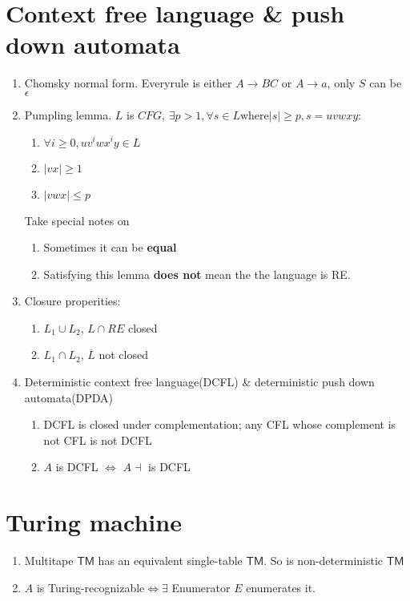 \documentclass{article}
\newcommand{\TM}{\mathsf{TM}}
\newcommand{\TR}{Turing-recognizable}
\begin{document}
\section{Context free language \& push down automata}\begin{enumerate}
	\item Chomsky normal form. Everyrule is either $A \rightarrow BC$ or $A \rightarrow a$, only $S$ can be $\epsilon$
	\item Pumpling lemma. $L$ is $CFG$, $\exists p > 1, \forall s \in L \text{where} |s| \ge p, s = uvwxy$:
	\begin{enumerate}
		\item $\forall i \ge 0, uv^iwx^iy \in L$
		\item $|vx| \ge 1$
		\item $|vwx| \le p$
	\end{enumerate}
	Take special notes on
	\begin{enumerate}
		\item Sometimes it can be \textbf{equal}
		\item Satisfying this lemma \textbf{does not} mean the the language is RE.
	\end{enumerate}
	\item Closure properities:
	\begin{enumerate}
		\item $L_1 \cup L_2$, $L \cap RE$ closed
		\item $L_1 \cap L_2$, $\overline{L}$ not closed
	\end{enumerate}
	\item Deterministic context free language(DCFL) \& deterministic push down automata(DPDA)
	\begin{enumerate}
		\item DCFL is closed under complementation; any CFL whose complement is not CFL is not DCFL
		\item $A$ is DCFL $\Longleftrightarrow$ $A\dashv$ is DCFL
	\end{enumerate}
\end{enumerate}


\section{Turing machine}\begin{enumerate}
	\item Multitape $\TM$ has an equivalent single-table $\TM$. So is non-deterministic $\TM$
	\item $A$ is \TR $\Longleftrightarrow \exists$ Enumerator $E$ enumerates it.
\end{enumerate}
\end{document}
